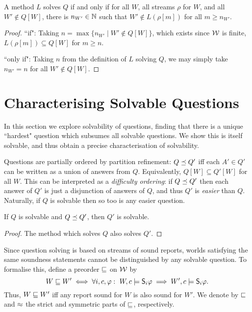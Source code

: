 \begin{proposition}
    \label{prop_elimination_solving}
    A method $L$ solves $Q$ if and only if for all $W$, all streams $\rho$ for
    $W$, and all $W' \notin Q[W]$, there is $n_{W'} \in \mathbb{N}$ such that $W'
    \notin L(\rho[m])$ for all $m \ge n_{W'}$.
\end{proposition}

\begin{proof}
    ``if": Taking $n = \max\{n_{W'} \mid W' \notin Q[W]\}$, which exists
    since $\mathcal{W}$ is finite, $L(\rho[m]) \subseteq Q[W]$ for $m \ge
    n$.

    ``only if": Taking $n$ from the definition of $L$ solving $Q$, we may
    simply take $n_{W'} = n$ for all $W' \notin Q[W]$.
\end{proof}

\section{Characterising Solvable Questions}
\label{sec_characterising_solvable_questions}

In this section we explore solvability of questions, finding that there is a
unique ``hardest" question which subsumes all solvable questions. We show this
is itself solvable, and thus obtain a precise characterisation of solvability.

Questions are partially ordered by partition refinement: $Q \preceq Q'$ iff
each $A' \in Q'$ can be written as a union of answers from $Q$. Equivalently,
$Q[W] \subseteq Q'[W]$ for all $W$. This can be interpreted as a
\emph{difficulty ordering}: if $Q \preceq Q'$ then each answer of $Q'$ is just
a disjunction of answers of $Q$, and thus $Q'$ is \emph{easier} than $Q$.
Naturally, if $Q$ is solvable then so too is any easier question.

\begin{proposition}
    \label{prop_easier_questions_also_solvable}
    If $Q$ is solvable and $Q \preceq Q'$, then $Q'$ is solvable.
\end{proposition}
\begin{proof}
    The method which solves $Q$ also solves $Q'$.
\end{proof}

Since question solving is based on streams of sound reports, worlds satisfying
the same soundness statements cannot be distinguished by any solvable question.
To formalise this, define a preorder $\sqsubseteq$ on $\mathcal{W}$ by
\[
    W \sqsubseteq W'
    \iff
    \forall i, c, \varphi:\
        W, c \models \mathsf{S}_i\varphi \implies W', c \models \mathsf{S}_i\varphi.
\]
Thus, $W \sqsubseteq W'$ iff any report sound for $W$ is also sound for $W'$. We
denote by $\sqsubset$ and $\approx$ the strict and symmetric parts of $\sqsubseteq$,
respectively.\footnotemark{}

